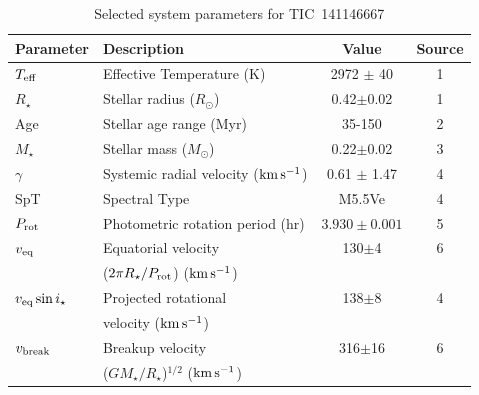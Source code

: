 \documentclass{nature3}
\newcommand{\kms}{\ensuremath{\rm km\,s^{-1}}}
\begin{document}
\begin{table}
\small
\setlength{\tabcolsep}{2pt}
\centering
\caption{Selected system parameters for TIC~141146667}
\label{tab:params}
\begin{tabular}{llcc}
\hline \hline
Parameter & Description & Value & Source\\
\hline 
%
$T_{\rm eff}$\dotfill                   & Effective Temperature (K) \hspace{9pt}\dotfill                 & 2972 $\pm$ 40    & 1 \\
%
$R_\star$\dotfill                       & Stellar radius ($R_\odot$)\dotfill                             & 0.42$\pm$0.02    & 1 \\
%
Age                                     & Stellar age range (Myr)\dotfill                                & 35-150           & 2 \\
%
$M_\star$\dotfill                       & Stellar mass ($M_\odot$)\dotfill                               & 0.22$\pm$0.02    & 3 \\
%
$\gamma$\dotfill                        & Systemic radial velocity (\kms)\dotfill                        & 0.61 $\pm$ 1.47  & 4 \\
%
SpT\dotfill                             & Spectral Type\dotfill                                          & M5.5Ve           & 4 \\
%
$P_{\rm rot}$\dotfill                   & Photometric rotation period (hr)\dotfill                       & $3.930\pm 0.001$ & 5 \\
%
$v_{\rm eq}$\dotfill		                & Equatorial velocity \dotfill                                   &  130$\pm$4       & 6 \\
                                        & \hspace{3pt} ($2\pi R_\star/P_{\rm rot}$) (\kms)	             &                      \\
%
$v_{\rm eq}\sin{i_\star}$\dotfill		    & Projected rotational\dotfill                                   &  138$\pm$8       & 4 \\
                                        & \hspace{3pt} velocity (\kms)	                                 &                      \\
%
$v_{\rm break}$\dotfill		              & Breakup velocity \dotfill                                      &  316$\pm$16      & 6 \\
                                        & \hspace{3pt} ($G M_\star / R_\star$)$^{1/2}$ (\kms)	           &                      \\

\end{tabular}
\end{table}
\end{document}
